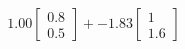 \documentclass[preview]{standalone}
\begin{document}
\begin{align*}
1.00 \begin{bmatrix} 0.8 \\ 0.5 \end{bmatrix} + -1.83 \begin{bmatrix} 1 \\ 1.6 \end{bmatrix}
\end{align*}
\end{document}
